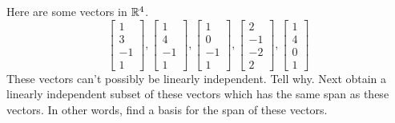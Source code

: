\documentclass{ximera}
\begin{document}
\begin{problem}\label{prb:3.31} Here are some vectors in $\mathbb{R}^{4}$.
\begin{equation*}
\left[
\begin{array}{r}
1 \\
3 \\
-1 \\
1
\end{array}
\right] ,\left[
\begin{array}{r}
1 \\
4 \\
-1 \\
1
\end{array}
\right] ,\left[
\begin{array}{r}
1 \\
0 \\
-1 \\
1
\end{array}
\right] ,\left[
\begin{array}{r}
2 \\
-1 \\
-2 \\
2
\end{array}
\right] ,\left[
\begin{array}{r}
1 \\
4 \\
0 \\
1
\end{array}
\right]
\end{equation*}
These vectors can't possibly be linearly independent. Tell why. Next obtain a
linearly independent subset of these vectors which has the same span as
these vectors. In other words, find a basis for the span of these vectors.
\end{problem}
\end{document}
